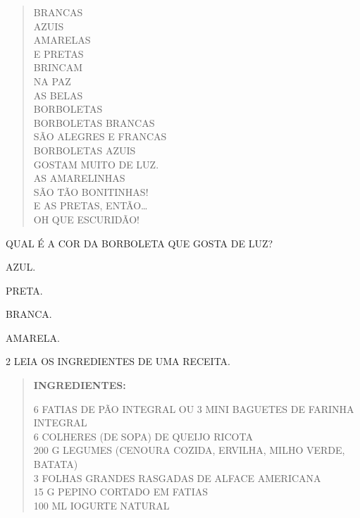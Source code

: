 \begin{verse}
BRANCAS\\
AZUIS\\
AMARELAS\\
E PRETAS\\
BRINCAM\\
NA PAZ\\
AS BELAS\\
BORBOLETAS\\
BORBOLETAS BRANCAS\\
SÃO ALEGRES E FRANCAS\\
BORBOLETAS AZUIS\\
GOSTAM MUITO DE LUZ.\\
AS AMARELINHAS\\
SÃO TÃO BONITINHAS!\\
E AS PRETAS, ENTÃO\ldots{}\\
OH QUE ESCURIDÃO!
\end{verse}


QUAL É A COR DA BORBOLETA QUE GOSTA DE LUZ?

\begin{escolha}
\item
  AZUL.
\item
  PRETA.
\item
  BRANCA.
\item
  AMARELA.
\end{escolha}

\num{2} LEIA OS INGREDIENTES DE UMA RECEITA.

\begin{quote}
\textbf{INGREDIENTES:}\\

\begin{flushleft}
6 FATIAS DE PÃO INTEGRAL OU 3 MINI BAGUETES DE FARINHA INTEGRAL\\
6 COLHERES (DE SOPA) DE QUEIJO RICOTA\\
200 G LEGUMES (CENOURA COZIDA, ERVILHA, MILHO VERDE, BATATA)\\
3 FOLHAS GRANDES RASGADAS DE ALFACE AMERICANA\\
15 G PEPINO CORTADO EM FATIAS\\
100 ML IOGURTE NATURAL
\end{flushleft}

\end{quote}

